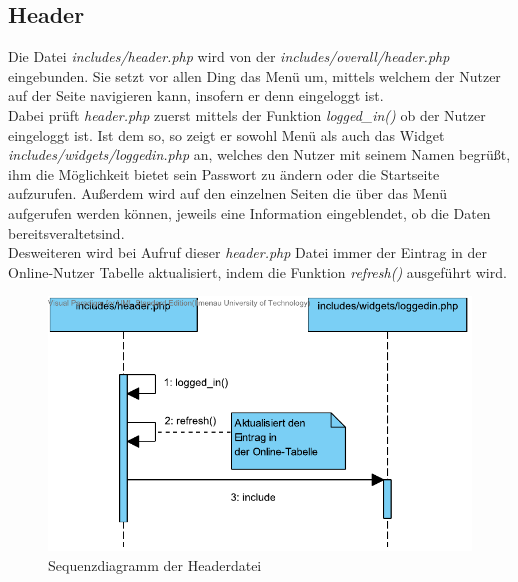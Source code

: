\documentclass[fontsize = 12pt, paper = a4]{scrreprt}
\begin{document}
\newpage
\subsection{Header}
Die Datei \textit{includes/header.php} wird von der \textit{includes/overall/header.php} eingebunden. Sie setzt vor allen Ding das Menü um, mittels welchem der Nutzer auf der Seite navigieren kann, insofern er denn eingeloggt ist.\\
Dabei prüft \textit{header.php} zuerst mittels der Funktion \textit{logged\_in()} ob der Nutzer eingeloggt ist. Ist dem so, so zeigt er sowohl Menü als auch das Widget \textit{includes/widgets/loggedin.php} an, welches den Nutzer mit seinem Namen begrüßt, ihm die Möglichkeit bietet sein Passwort zu ändern oder die Startseite aufzurufen. Außerdem wird auf den einzelnen Seiten die über das Menü aufgerufen werden können, jeweils eine Information eingeblendet, ob die Daten bereits\glqq veraltet\grqq sind.\\
Desweiteren wird bei Aufruf dieser \textit{header.php} Datei immer der Eintrag in der Online-Nutzer Tabelle aktualisiert, indem die Funktion \textit{refresh()} ausgeführt wird.

\begin{figure}[h]
\centering
\includegraphics[scale = 1]{header}
\caption[Sequenzdiagramm der Headerdatei]{Sequenzdiagramm der Headerdatei}
\label{header}
\end{figure}
\end{document}
